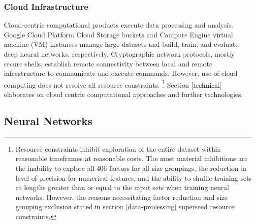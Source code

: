 \documentclass[12pt]{article}
\begin{document}
\subsubsection*{Cloud Infrastructure}
Cloud-centric computational products execute data processing and analysis.
Google Cloud Platform Cloud Storage buckets and Compute Engine virtual machine (VM) instances manage large datasets and build, train, and evaluate deep neural networks, respectively.
Cryptographic network protocols, mostly secure shells, establish remote connectivity between local and remote infrastructure to communicate and execute commands.
However, use of cloud computing does not resolve all resource constraints. 
\footnote{Resource constraints inhibit exploration of the entire dataset within reasonable timeframes at reasonable costs.
The most material inhibitions are the inability to explore all 406 factors for all size groupings, the reduction in level of precision for numerical features, and
the ability to shuffle training sets at lengths greater than or equal to the input sets when training neural networks.
However, the reasons necessitating factor reduction and size grouping exclusion stated in section \ref{data-processing} superseed resource constraints.}
Section \ref{technical} elaborates on cloud centric computational approaches and further technologies.

\subsection{Neural Networks}
\end{document}
